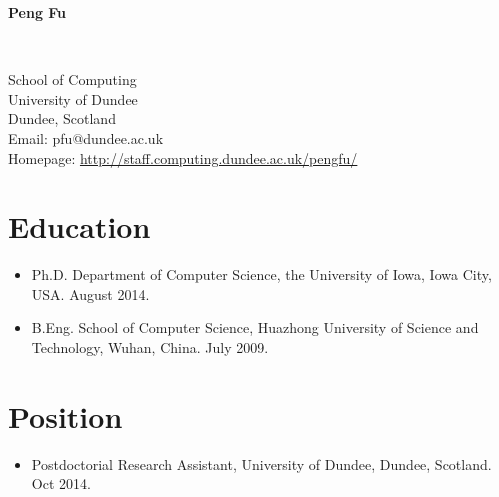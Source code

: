 \documentclass[11pt]{article}
\begin{document}
\begin{center}
{\Large{\bfseries Peng Fu}}

\

School of Computing\\
University of Dundee\\
Dundee, Scotland \\
Email: pfu@dundee.ac.uk\\
Homepage: \url{http://staff.computing.dundee.ac.uk/pengfu/}

\end{center}



\section*{Education}

\begin{itemize}
\item Ph.D. Department of Computer Science, the University of Iowa, Iowa City, USA. August 2014. 
  \item B.Eng. School of Computer Science, Huazhong University of Science and Technology, Wuhan, China. July 2009. %
\end{itemize}

\section*{Position}

\begin{itemize}
\item Postdoctorial Research Assistant, University of Dundee, Dundee, Scotland. Oct 2014.
\end{itemize}
\end{document}
